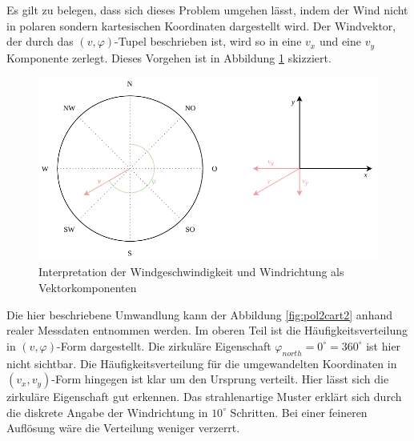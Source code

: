 \documentclass[
12pt, %
toc=listofnumbered, %
toc=chapterentrydotfill, %
numbers=noenddot, %
captions=tableheading, %
bibliography=numbered
]{scrreprt}
\begin{document}
Es gilt zu belegen, dass sich dieses Problem umgehen lässt, indem der Wind nicht in polaren sondern kartesischen Koordinaten dargestellt wird. Der Windvektor, der durch das $(v,\varphi)$-Tupel beschrieben ist, wird so in eine $v_x$ und eine $v_y$ Komponente zerlegt. Dieses Vorgehen ist in Abbildung \ref{fig:pol2cart} skizziert.

\begin{figure}[tph]
	\begin{center}
		\includegraphics[scale = 1]{./images/pol2cart.pdf}
		\caption{Interpretation der Windgeschwindigkeit und Windrichtung als Vektorkomponenten}
		\label{fig:pol2cart}
	\end{center}
\end{figure}

Die hier beschriebene Umwandlung kann der Abbildung \ref{fig:pol2cart2} anhand realer Messdaten entnommen werden. Im oberen Teil ist die Häufigkeitsverteilung in $(v,\varphi)$-Form dargestellt. Die zirkuläre Eigenschaft $\varphi_{north} = 0^\circ = 360^\circ$ ist hier nicht sichtbar. Die Häufigkeitsverteilung für die umgewandelten Koordinaten in $(v_x,v_y)$-Form hingegen ist klar um den Ursprung verteilt. Hier lässt sich die zirkuläre Eigenschaft gut erkennen. Das strahlenartige Muster erklärt sich durch die diskrete Angabe der Windrichtung in $10^\circ$ Schritten. Bei einer feineren Auflösung wäre die Verteilung weniger verzerrt.
\end{document}
